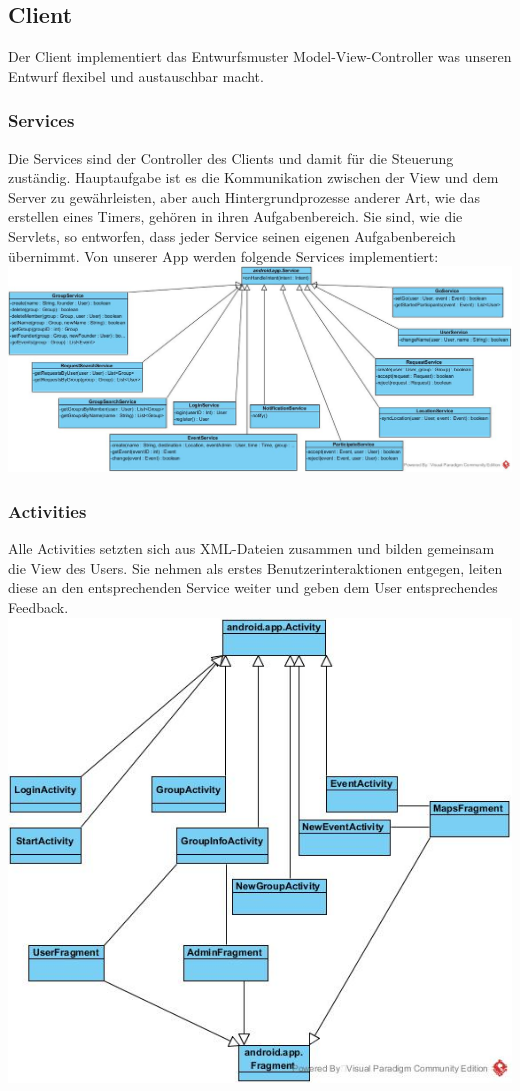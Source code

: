 	\subsection{Client}
	Der Client implementiert das Entwurfsmuster Model-View-Controller was unseren Entwurf flexibel und austauschbar macht.
	\subsubsection{Services}
	Die Services sind der Controller des Clients und damit für die Steuerung zuständig. Hauptaufgabe ist es die Kommunikation zwischen der View und dem Server zu gewährleisten, aber auch Hintergrundprozesse anderer Art, wie das erstellen eines Timers, gehören in ihren Aufgabenbereich.
Sie sind, wie die Servlets, so entworfen, dass jeder Service seinen eigenen Aufgabenbereich übernimmt.
Von unserer App werden folgende Services implementiert:
\newline
\includegraphics[width=1.1\textwidth]{Controler.jpg}

	\subsubsection{Activities}
	Alle Activities setzten sich aus XML-Dateien zusammen und bilden gemeinsam die View des Users.
Sie nehmen als erstes Benutzerinteraktionen entgegen, leiten diese an den entsprechenden Service weiter und geben dem User entsprechendes Feedback.
	\newline
	\includegraphics[width=1.1\textwidth]{ViewClassDiagram.jpg}
	
